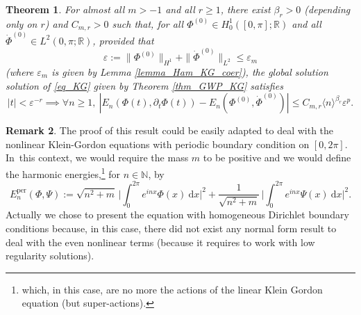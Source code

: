 \documentclass[JEP,XML,SOM,Unicode,NoEqCountersInSection,published]{cedram}
\newtheorem{theorem}{Theorem}[section]
\theoremstyle{definition}
\newtheorem{remark}[theorem]{Remark}
\begin{document}
\begin{theorem}
\label{thm_main_KG}
For almost all $m>-1$ and all $r\geq 1$, there exist $\beta_r>0$ (depen\-ding only on $r$) and $C_{m,r}>0$ such that, for all
$\Phi^{(0)} \in H^1_0([0,\pi];\mathbb{R})$ and all $\dot{\Phi}^{(0)} \in L^2(0,\pi;\mathbb{R})$, provided that
\[
\varepsilon:=\|\Phi^{(0)}\|_{H^1} +\|\dot{\Phi}^{(0)}\|_{ L^2} \leq \varepsilon_m
\]
(where $\varepsilon_m$ is given by Lemma \ref{lemma_Ham_KG_coer}), the global solution solution of \eqref{eq_KG} given by Theorem \ref{thm_GWP_KG} satisfies
\[
|t|< \varepsilon^{-r} \implies \forall n\geq 1, \ |E_n(\Phi(t),\partial_t \Phi(t)) - E_n(\Phi^{(0)},\dot{\Phi}^{(0)})| \leq C_{m,r} \langle n \rangle^{\beta_r} \varepsilon^{p}.
\]
\end{theorem}
\begin{remark}\label{rem_KG_per} The proof of this result could be easily adapted to deal with the nonlinear Klein-Gordon equations with periodic boundary condition on $[0,2\pi]$. In~this context, we would require the mass $m$ to be positive and we would define the harmonic energies,\footnote{which, in this case, are no more the actions of the linear Klein Gordon equation (but super-actions).} for $n\in \mathbb{N}$, by
\begin{equation*}
E_n^{\mathrm{per}}(\Phi,\Psi):= \sqrt{n^2+m}\, \biggl| \int_0^{2\pi} e^{inx} \Phi(x) \ \mathrm{d}x \biggr|^2+ \frac1{\sqrt{n^2+m}}\, \biggl| \int_0^{2\pi} e^{inx} \Psi(x) \ \mathrm{d}x \biggr|^2.
\end{equation*}
Actually we chose to present the equation with homogeneous Dirichlet boundary conditions because, in this case, there did not exist any normal form result to deal with the even nonlinear terms (because it requires to work with low regularity solutions).
\end{remark}
\end{document}

